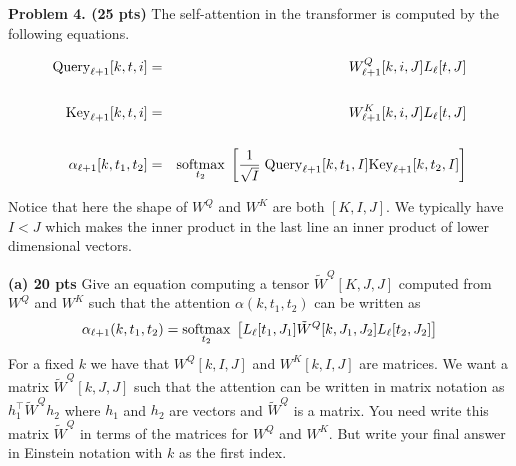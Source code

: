 \documentclass{article}
\newcommand{\solution}[1]{}
\begin{document}
\solution{
  The original version uses $2(I \times J)$ key-query matrix parameters for each head.  If we use only the single query matrix we use $J^2$ parameters for each head.  These are the same for $I = J/2$.
}

\bigskip

{\bf Problem 4. (25 pts)} The self-attention in the transformer is computed by the following equations.

\begin{eqnarray*}
\mathrm{Query}_{\ell+1}[k,t,i] & = & W^Q_{\ell+1}[k,i,J]L_\ell[t,J] \\
\\
\mathrm{Key}_{\ell+1}[k,t,i] & = &  W^K_{\ell+1}[k,i,J]L_\ell[t,J] \\
\\
\alpha_{\ell+1}[k,t_1,t_2] & = & \operatorname*{softmax}_{t_2}\; \left[\frac{1}{\sqrt{I}}\;\mathrm{Query}_{\ell+1}[k,t_1,I]\mathrm{Key}_{\ell+1}[k,t_2,I]\right]
\end{eqnarray*}

Notice that here the shape of $W^Q$ and $W^K$ are both $[K,I,J]$.  We typically have $I < J$ which makes the inner product in the last line an inner product of lower dimensional vectors.

\medskip
{\bf(a) 20 pts} Give an equation computing a tensor $\tilde{W}^Q[K,J,J]$ computed from $W^Q$ and $W^K$ such that the attention $\alpha(k,t_1,t_2)$ can be written as
$$\alpha_{\ell+1}(k,t_1,t_2) = \operatorname*{softmax}_{t_2}\;\left[L_\ell[t_1,J_1]\tilde{W}^Q[k,J_1,J_2]L_\ell[t_2,J_2]\right]$$
For a fixed $k$ we have that $W^Q[k,I,J]$ and $W^K[k,I,J]$ are matrices.  We want a matrix $\tilde{W}^Q[k,J,J]$ such that the attention can be written in matrix notation as
$h_1^\top \tilde{W}^Q h_2$ where $h_1$ and $h_2$ are vectors and $\tilde{W}^Q$ is a matrix.
You need write this matrix $\tilde{W}^Q$ in terms of the matrices for $W^Q$ and $W^K$.  But write your final answer in Einstein notation with $k$ as the first index.

\solution{
  This is easier to do in vector-matrix notation for a fixed k.  But it can also be done entirely in Einstein notation:
  \begin{eqnarray*}
    & = & \softmax_{t_2} \left[\frac{1}{\sqrt{I}}\;(L_\ell(t_1,J_1)W^Q[k,I,J_1])\;\;(W^K[k,I,J_2]L_\ell(t_1,J_2))\right] \\
    & = & \softmax_{t_2} \left[\frac{1}{\sqrt{I}}\;\sum_{j_1,j_2,i} L_\ell(t_1,j_1)\;W^Q[k,i,j_1]\;W^K[k,i,j_2]\;L_\ell(t_1,j_2)\right] \\
    & = & \softmax_{t_2} \left[\sum_{j_1,j_2} L_\ell(t_1,j_1) \; \left(\frac{1}{\sqrt{I}}\; \sum_i \;W^Q[k,i,j_1])\;\;(W^K[k,i,j_2])\right) \;L_\ell(t_1,j_2)\right] \\
    & = & \softmax_{t_2} \left[\sum_{j_1,j_2} L_\ell(t_1,j_1) \; \tilde{W}^Q[k,j_1,j_2] \;L_\ell(t_1,j_2)\right] \\
        & = & \softmax_{t_2} \left[L_\ell(t_1,J_1) \; \tilde{W}^Q[k,J_1,J_2] \;L_\ell(t_1,J_2)\right] \\
    \\
    \tilde{W}^Q[k,j_1,j_2] & = & \frac{1}{\sqrt{I}}\;W^Q[k,I,j_1]W^k[k,I,j_2]
    \end{eqnarray*}
}
\end{document}
